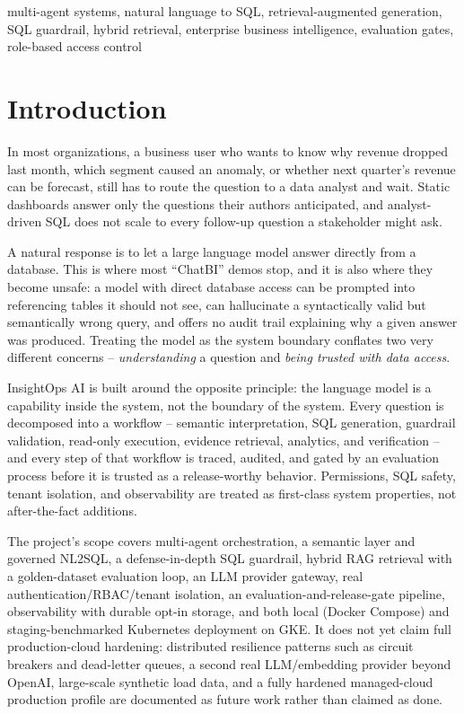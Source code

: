 \documentclass[conference]{IEEEtran}
\begin{document}
\begin{IEEEkeywords}
multi-agent systems, natural language to SQL, retrieval-augmented
generation, SQL guardrail, hybrid retrieval, enterprise business
intelligence, evaluation gates, role-based access control
\end{IEEEkeywords}

\section{Introduction}

In most organizations, a business user who wants to know why revenue
dropped last month, which segment caused an anomaly, or whether next
quarter's revenue can be forecast, still has to route the question to a
data analyst and wait. Static dashboards answer only the questions their
authors anticipated, and analyst-driven SQL does not scale to every
follow-up question a stakeholder might ask.

A natural response is to let a large language model answer directly from a
database. This is where most ``ChatBI'' demos stop, and it is also where
they become unsafe: a model with direct database access can be prompted
into referencing tables it should not see, can hallucinate a syntactically
valid but semantically wrong query, and offers no audit trail explaining
why a given answer was produced. Treating the model as the system boundary
conflates two very different concerns -- \emph{understanding} a question
and \emph{being trusted with data access}.

InsightOps AI is built around the opposite principle: the language model is
a capability inside the system, not the boundary of the system. Every
question is decomposed into a workflow -- semantic interpretation, SQL
generation, guardrail validation, read-only execution, evidence retrieval,
analytics, and verification -- and every step of that workflow is traced,
audited, and gated by an evaluation process before it is trusted as a
release-worthy behavior. Permissions, SQL safety, tenant isolation, and
observability are treated as first-class system properties, not
after-the-fact additions.

The project's scope covers multi-agent orchestration, a semantic layer and
governed NL2SQL, a defense-in-depth SQL guardrail, hybrid RAG retrieval
with a golden-dataset evaluation loop, an LLM provider gateway, real
authentication/RBAC/tenant isolation, an evaluation-and-release-gate
pipeline, observability with durable opt-in storage, and both local
(Docker Compose) and staging-benchmarked Kubernetes deployment on GKE. It
does not yet claim full production-cloud hardening: distributed resilience
patterns such as circuit breakers and dead-letter queues, a second real
LLM/embedding provider beyond OpenAI, large-scale synthetic load data, and
a fully hardened managed-cloud production profile are documented as future
work rather than claimed as
done.
\end{document}

